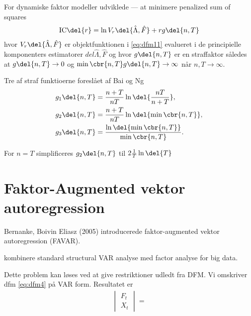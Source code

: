 For dynamiske faktor modeller udviklede --- at minimere penalized sum of squares
\begin{align*}
\text{IC} \del{r} = \ln V_r \del{\hat{\Lambda}, \hat{F}} + r g \del{n,T}
\end{align*}
hvor \(V_r \del{\hat{\Lambda}, \hat{F}}\) er objektfunktionen i \eqref{eq:dfm11} evalueret i de principielle komponenters estimatorer \(del{\hat{\Lambda}, \hat{F}}\) og hvor \(g \del{n,T}\) er en straffaktor således at \(g \del{n,T} \rightarrow 0\) og \(\min \cbr{n, T} g \del{n,T} \rightarrow \infty\) når \(n, T \rightarrow \infty\).

Tre af straf funktioerne foreslået af Bai og Ng 
\begin{align*}
g_1 \del{n,T} &= \frac{n + T}{n T} \ln \del{\frac{nT}{n + T}}, \\
g_2 \del{n,T} &= \frac{n + T}{n T} \ln \del{ \min \cbr{n, T}}, \\
g_3 \del{n,T} &= \frac{\ln \del{\min \cbr{n, T}}}{\min \cbr{n, T}}.
\end{align*}

For \(n = T\) simplificeres \(g_2 \del{n,T} \) til \(2 \frac{1}{T} \ln \del{T}\)



\section{Faktor-Augmented vektor autoregression}
Bernanke, Boivin Eliasz (2005) introducerede faktor-augmented vektor autoregression (FAVAR).

kombinere standard structural VAR analyse med factor analyse for big data.

Dette problem kan løses ved at give restriktioner udledt fra DFM.
Vi omskriver dfm \eqref{eq:dfm4} på VAR form.
Resultatet er 
\begin{align*}
\begin{vmatrix}
F_t \\ X_t
\end{vmatrix} = 
\end{align*}